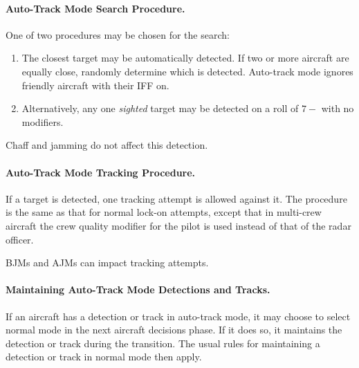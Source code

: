 {\begin{advancedrules}
\begin{itemize}
\end{itemize}


\paragraph{Auto-Track Mode Search Procedure.}

One of two procedures may be chosen for the search:
\begin{enumerate}
\item The closest target may be automatically detected. If two or more aircraft are equally close, randomly determine which is detected. Auto-track mode ignores friendly aircraft with their IFF on.
\item Alternatively, any one \emph{sighted} target may be detected on a roll of $7-$ with no modifiers.
\end{enumerate}

Chaff and jamming do not affect this detection. 

\paragraph{Auto-Track Mode Tracking Procedure.}

If a target is detected, one tracking attempt is allowed against it. The procedure is the same as that for normal lock-on attempts, except that in  multi-crew aircraft the crew quality modifier for the pilot is used instead of that of the radar officer.

BJMs and AJMs can impact tracking attempts.

\paragraph{Maintaining Auto-Track Mode Detections and Tracks.}

If an aircraft has a detection or track in auto-track mode, it may choose to select normal mode in the next aircraft decisions phase. If it does so, it maintains the detection or track during the transition. The usual rules for maintaining a detection or track in normal mode then apply.


\end{advancedrules}}
